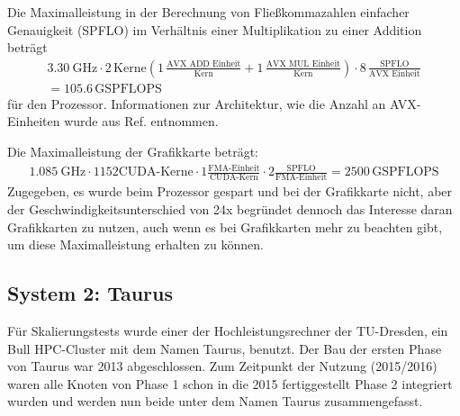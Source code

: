 Die Maximalleistung in der Berechnung von Fließkommazahlen einfacher Genauigkeit (SPFLO) im Verhältnis einer Multiplikation zu einer Addition beträgt
\begin{align}
	\SI{3.30}{\giga\hertz} \cdot
	2\,\text{Kerne} \left(
		1\,\frac{ \text{AVX ADD Einheit} }{ \text{Kern} } +
		1\,\frac{ \text{AVX MUL Einheit} }{ \text{Kern} }
	\right) \cdot
	8\,\frac{ \text{SPFLO} }{ \text{AVX Einheit} } \\
	= 105.6\,\text{GSPFLOPS}
\end{align}
für den Prozessor. Informationen zur Architektur, wie die Anzahl an AVX-Einheiten wurde aus Ref.\cite{cesga} entnommen.

Die Maximalleistung der Grafikkarte beträgt:
\begin{align}
	\SI{1.085}{\giga\hertz} \cdot 1152 \text{CUDA-Kerne} \cdot
	1 \frac{ \text{FMA-Einheit} }{ \text{CUDA-Kern} } \cdot
	2 \frac{ \text{SPFLO} }{ \text{FMA-Einheit} }
	= 2500\,\text{GSPFLOPS}
\end{align}
Zugegeben, es wurde beim Prozessor gespart und bei der Grafikkarte nicht, aber der Geschwindigkeitsunterschied von 24x begründet dennoch das Interesse daran Grafikkarten zu nutzen, auch wenn es bei Grafikkarten mehr zu beachten gibt, um diese Maximalleistung erhalten zu können.



\subsection{System 2: Taurus}
\label{sct:taurus}


Für Skalierungstests wurde einer der Hochleistungsrechner der TU-Dresden, ein Bull HPC-Cluster mit dem Namen Taurus, benutzt. Der Bau der ersten Phase von Taurus war 2013 abgeschlossen\cite{taurusnutzerschulung}. Zum Zeitpunkt der Nutzung (2015/2016) waren alle Knoten von Phase 1 schon in die 2015 fertiggestellt\cite{heisehrsk2} Phase 2 integriert wurden\cite{doctudtaurushardware} und werden nun beide unter dem Namen Taurus zusammengefasst.

